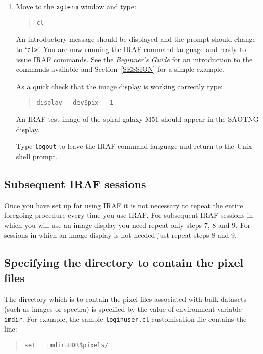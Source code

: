 \documentclass[twoside,11pt]{article}
\begin{document}
\begin{enumerate}
  \item Move to the {\tt xgterm} window and type:

  \begin{quote}
   {\tt cl}
  \end{quote}

   An introductory message should be displayed and the prompt should
   change to `\verb-cl>-'.  You are now running the IRAF command language
   and ready to issue IRAF commands.  See the {\it Beginner's
   Guide}\/\cite{BARNES93} for an introduction to the commands available
   and Section~\ref{SESSION} for a simple example.

   As a quick check that the image display is working correctly type:

  \begin{quote}
   {\tt display ~ dev\$pix ~ 1}
  \end{quote}

   An IRAF test image of the spiral galaxy M51 should appear in the SAOTNG
   display.

   Type {\tt logout} to leave the IRAF command language and return to the
   Unix shell prompt.

\end{enumerate}

\subsection{\label{SUBSQ_IRAF}Subsequent IRAF sessions}

Once you have set up for using IRAF it is not necessary to repeat the
entire foregoing procedure every time you use IRAF.  For subsequent
IRAF sessions in which you will use an image display you need repeat
only steps 7, 8 and 9.  For sessions in which an image display is
not needed just repeat steps 8 and 9.

\subsection{\label{PIXELS}Specifying the directory to contain the pixel
files}

The directory which is to contain the pixel files associated with bulk
datasets (such as images or spectra) is specified by the value of
environment variable {\tt imdir}.  For example, the sample {\tt loginuser.cl}
customisation file contains the line:

\begin{quote}
{\tt set ~ imdir=HDR\$pixels/}
\end{quote}
\end{document}
